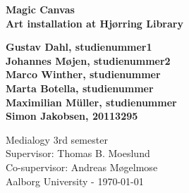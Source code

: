 \thispagestyle{empty} %
\hspace{6cm} \vspace{6cm}
\begin{center}
\textbf{\Huge {Magic Canvas}\\ \vspace{1cm}
\huge{Art installation at Hj{\o}rring Library}}
\end{center}
\vspace{1cm}
\begin{center}
\Large{\textbf{Gustav Dahl, studienummer1 \\ Johannes M{\o}jen, studienummer2
\\ Marco Winther, studienummer \\ Marta Botella, studienummer \\ Maximilian M\"uller, studienummer
\\ Simon Jakobsen, 20113295}}
\end{center}
\vfill
Medialogy 3rd semester\\
Supervisor: Thomas B. Moeslund\\
Co-supervisor: Andreas M{\o}gelmose\\
Aalborg University - \today
\thispagestyle{empty}
\setcounter{page}{0}